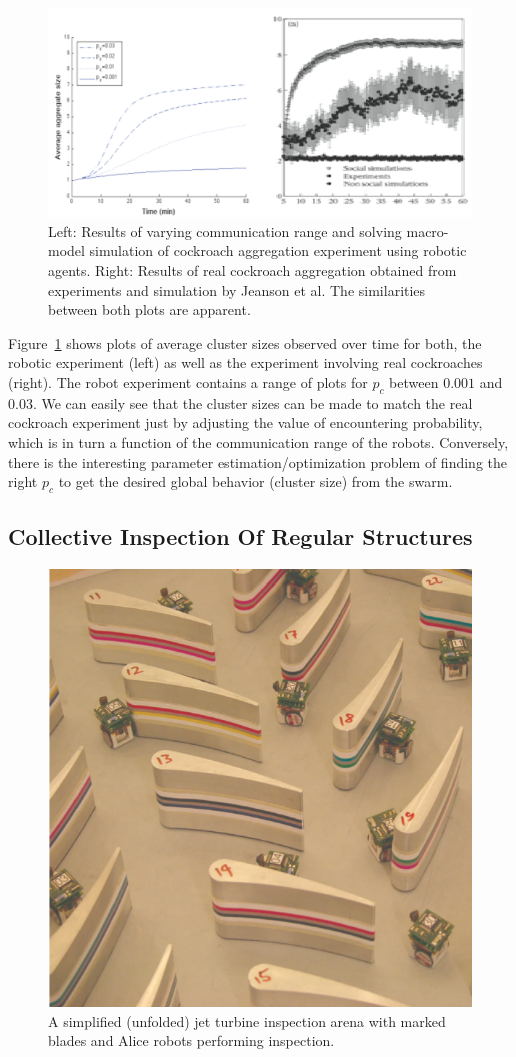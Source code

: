 \documentclass[Main.tex]{subfiles}
\begin{document}
\begin{figure}[!htb]
\centering\includegraphics[width=.75\textwidth]{assets/roachRes.png}
\caption{Left: Results of varying communication range and solving macro-model simulation of cockroach aggregation experiment using robotic agents. Right: Results of real cockroach aggregation obtained from experiments and simulation by Jeanson et al. The similarities between both plots are apparent.}\label{fig:roachres}
\end{figure}

Figure~\ref{fig:roachres} shows plots of average cluster sizes observed over time for both, the robotic experiment (left) as well as the experiment involving real cockroaches (right). The robot experiment contains a range of plots for $p_c$ between $0.001$ and $0.03$. We can easily see that the cluster sizes can be made to match the real cockroach experiment just by adjusting the value of encountering probability, which is in turn a function of the communication range of the robots. Conversely, there is the interesting parameter estimation/optimization problem of finding the right $p_c$ to get the desired global behavior (cluster size) from the swarm.

\subsection{Collective Inspection Of Regular Structures}

\begin{figure}[!htb]
\centering\includegraphics[width=.5\textwidth]{assets/turbexp.png}
\caption{A simplified (unfolded) jet turbine inspection arena with marked blades and Alice robots performing inspection.}\label{fig:turbexp}
\end{figure}
\end{document}
